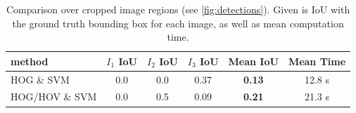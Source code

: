 \documentclass[11pt]{article}
\begin{document}
\begin{table}
    \centering
    \begin{tabular}{lccccc}
        \toprule
        method & \( I_1 \) IoU & \( I_2 \) IoU & \( I_3 \) IoU & Mean IoU & Mean Time \\
        \midrule
        HOG \& SVM              & 0.0   & 0.0 & 0.37 & \textbf{0.13} & 12.8 s \\
        HOG/HOV \& SVM          &  0.0  & 0.5 & 0.09 & \textbf{0.21} & 21.3 s \\
        \bottomrule
    \end{tabular}
    \caption{Comparison over cropped image regions (see \autoref{fig:detections}). Given is IoU with the ground truth bounding box for each image,
    as well as mean computation time.}
    \label{tab:class-iou}
\end{table}
\end{document}
